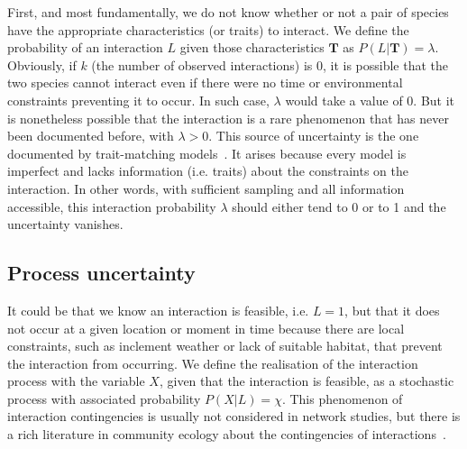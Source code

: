 \documentclass[12pt]{article}
\begin{document}
    First, and most fundamentally, we do not know whether or not a pair of species have the appropriate characteristics (or traits) to interact. We define the probability of an interaction $L$ given those characteristics $\mathbf{T}$ as $P(L | \mathbf{T})=\lambda$. Obviously, if $k$ (the number of observed interactions) is 0, it is possible that the two species cannot interact even if there were no time or environmental constraints preventing it to occur. In such case, $\lambda$ would take a value of 0. 
    But it is nonetheless possible that the interaction is a rare phenomenon that has never been documented before, with $\lambda>0$. This source of uncertainty is the one documented by trait-matching models~\citep{Bartomeus2016}. It arises because every model is imperfect and lacks information (i.e. traits) about the constraints on the interaction. In other words, with sufficient sampling and all information accessible, this interaction probability $\lambda$ should either tend to 0 or to 1 and the uncertainty vanishes. 

    \subsection*{Process uncertainty} 

    It could be that we know an interaction is feasible, i.e. $L=1$, but that it does not occur at a given location or moment in time because there are local constraints, such as inclement weather or lack of suitable habitat, that prevent the interaction from occurring. We define the realisation of the interaction process with the variable $X$, given that the interaction is feasible, as a stochastic process with associated probability $P(X|L)=\chi$. This phenomenon of interaction contingencies is usually not considered in network studies, but there is a rich literature in community ecology about the contingencies of interactions~\citep{}. 
\end{document}
